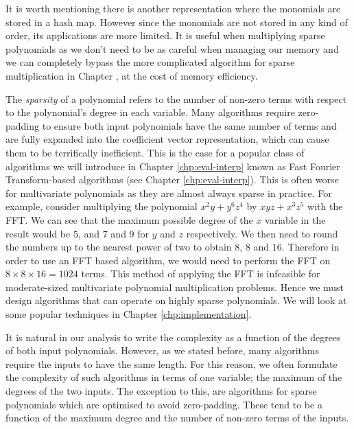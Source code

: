 It is worth mentioning there is another representation where the monomials are stored in a hash map. However since the monomials are not stored in any kind of order, its applications are more limited. It is useful when multiplying sparse polynomials as we don't need to be as careful when managing our memory and we can completely bypass the more complicated algorithm for sparse multiplication in Chapter \cite{chp:implementation}, at the cost of memory efficiency.

The \emph{sparsity} of a polynomial refers to the number of non-zero terms with respect to the polynomial's degree in each variable. Many algorithms require zero-padding to ensure both input polynomials have the same number of terms and are fully expanded into the coefficient vector representation, which can cause them to be terrifically inefficient. This is the case for a popular class of algorithms we will introduce in Chapter \ref{chp:eval-interp} known as Fast Fourier Transform-based algorithms (see Chapter \ref{chp:eval-interp}). This is often worse for multivariate polynomials as they are almost always sparse in practice. For example, consider multiplying the polynomial $x^2y + y^6z^4$ by $xyz + x^3z^5$ with the FFT. We can see that the maximum possible degree of the $x$ variable in the result would be $5$, and $7$ and $9$ for $y$ and $z$ respectively. We then need to round the numbers up to the nearest power of two to obtain $8$, $8$ and $16$. Therefore in order to use an FFT based algorithm, we would need to perform the FFT on $8 \times 8 \times 16 = 1024$ terms. This method of applying the FFT is infeasible for moderate-sized multivariate polynomial multiplication problems. Hence we must design algorithms that can operate on highly sparse polynomials. We will look at some popular techniques in Chapter \ref{chp:implementation}.

It is natural in our analysis to write the complexity as a function of the degrees of both input polynomials. However, as we stated before, many algorithms require the inputs to have the same length. For this reason, we often formulate the complexity of such algorithms in terms of one variable; the maximum of the degrees of the two inputs. The exception to this, are algorithms for sparse polynomials which are optimised to avoid zero-padding. These tend to be a function of the maximum degree and the number of non-zero terms of the inputs.


